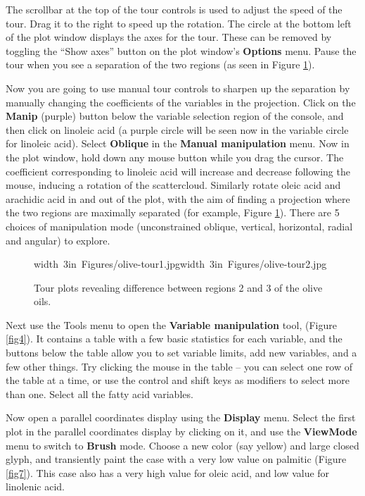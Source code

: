 \documentclass[11pt]{article}
\begin{document}
The scrollbar at the top of the tour controls is used to adjust the
speed of the tour.  Drag it to the right to speed up the rotation.
The circle at the bottom left of the plot window displays the axes
for the tour. These can be removed by toggling the ``Show axes''
button on the plot window's {\bf Options} menu.  Pause the tour when
you see a separation of the two regions (as seen in Figure
\ref{fig6}).

Now you are going to use manual tour controls to sharpen up the
separation by manually changing the coefficients of the variables in
the projection.  Click on the {\bf Manip} (purple) button below the
variable selection region of the console, and then click on linoleic
acid (a purple circle will be seen now in the variable circle for
linoleic acid).  Select {\bf Oblique} in the {\bf Manual
manipulation} menu.  Now in the plot window, hold down any mouse
button while you drag the cursor. The coefficient corresponding to
linoleic acid will increase and decrease following the mouse,
inducing a rotation of the scattercloud.  Similarly rotate oleic acid
and arachidic acid in and out of the plot, with the aim of finding a
projection where the two regions are maximally separated (for
example, Figure \ref{fig6}).  There are 5 choices of manipulation
mode (unconstrained oblique, vertical, horizontal, radial and
angular) to explore.

\begin{figure}[htp]
\hbox{\pdfimage width 3in {Figures/olive-tour1.jpg}\pdfimage width 3in {Figures/olive-tour2.jpg}}
\caption{Tour plots revealing difference between regions 2 and 3 of the
olive oils.}
\label{fig6}
\end{figure}

Next use the Tools menu to open the {\bf Variable manipulation} tool,
(Figure \ref{fig4}).  It contains a table with a few basic statistics
for each variable, and the buttons below the table allow you to set
variable limits, add new variables, and a few other things.  Try
clicking the mouse in the table -- you can select one row of the
table at a time, or use the control and shift keys as modifiers to
select more than one.  Select all the fatty acid variables.

Now open a parallel coordinates display using the {\bf Display} menu.
Select the first plot in the parallel coordinates display by
clicking on it, and use the {\bf ViewMode} menu to switch to {\bf
Brush} mode. Choose a new color (say yellow) and large closed glyph,
and transiently paint the case with a very low value on palmitic
(Figure \ref{fig7}). This case also has a very high value for oleic
acid, and low value for linolenic acid.
\end{document}
